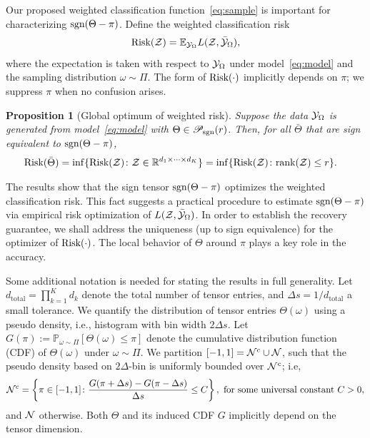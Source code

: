 \documentclass{article}
\theoremstyle{plain}
\newtheorem{prop}{Proposition}
\theoremstyle{definition}
\def\sign{\textup{sgn}}
\def\caliP{\mathscr{P}_{\textup{sgn}}}
\def\risk{\textup{Risk}}
\begin{document}
Our proposed weighted classification function~\eqref{eq:sample} is important for characterizing $\sign(\Theta-\pi)$. Define the weighted classification risk 
\begin{equation}\label{eq:population}
\textup{Risk}(\mathcal{Z})=\mathbb{E}_{\mathcal{Y}_\Omega}L(\mathcal{Z},\bar{\mathcal{Y}}_\Omega),
\end{equation}
where the expectation is taken with respect to $\mathcal{Y}_\Omega$ under model~\eqref{eq:model} and the sampling distribution $\omega\sim\Pi$. %
The form of $\textup{Risk}(\cdot)$ implicitly depends on $\pi$; we suppress $\pi$ when no confusion arises. 

\vspace{.05cm}
\begin{prop}[Global optimum of weighted risk]\label{prop:global}
Suppose the data $\mathcal{Y}_\Omega$ is generated from model~\eqref{eq:model} with $\Theta \in \caliP(r)$. Then, for all $\bar \Theta$ that are sign equivalent to $\sign(\Theta-\pi)$, 
\begin{align}\label{eq:optimal}
\textup{Risk}(\bar \Theta )&=\inf\{\textup{Risk}(\mathcal{Z})\colon \mathcal{Z}\in\mathbb{R}^{d_1\times \cdots \times d_K}\}
=\inf\{\textup{Risk}(\mathcal{Z})\colon \textup{rank} (\mathcal{Z})\leq r\}.
\end{align}
\end{prop}
The results show that the sign tensor $\sign(\Theta-\pi)$ optimizes the weighted classification risk. This fact suggests a practical procedure to estimate $\sign(\Theta-\pi)$ via empirical risk optimization of $L(\mathcal{Z},\bar {\mathcal{Y}}_\Omega)$. In order to establish the recovery guarantee, we shall address the uniqueness (up to sign equivalence) for the optimizer of $\risk(\cdot)$. The local behavior of $\Theta$ around $\pi$ plays a key role in the accuracy. 

Some additional notation is needed for stating the results in full generality. Let $d_\text{total}=\prod_{k=1}^K d_k$ denote the total number of tensor entries, and $\Delta s = 1/d_\text{total}$ a small tolerance. We quantify the distribution of tensor entries $\Theta(\omega)$ using a pseudo density, i.e., histogram with bin width $2\Delta s$. Let $G(\pi):=\mathbb{P}_{\omega\sim \Pi}[\Theta(\omega)\leq \pi]$ denote the cumulative distribution function (CDF) of $\Theta(\omega)$ under $\omega\sim \Pi$. We partition $[-1,1]=\mathcal{N}^c \cup \mathcal{N}$, such that the pseudo density based on $2\Delta$-bin is uniformly bounded over $\mathcal{N}^c$; i.e,
\[
\tN^c=\left\{\pi\in[-1,1] \colon {G(\pi+{\Delta s})-G(\pi-{\Delta s})\over \Delta s} \leq C \right\},\ \text{for some universal constant $C>0$},
\]
and $\mathcal{N}$ otherwise. Both $\Theta$ and its induced CDF $G$ implicitly depend on the tensor dimension. 
\end{document}
